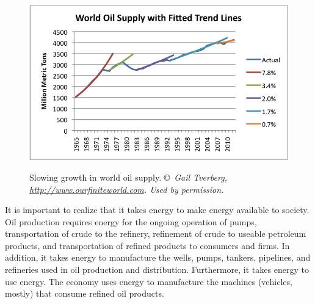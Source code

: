 \begin{figure}[!ht]
\centering\
\includegraphics[width=\linewidth]{Part_0/Chapter_Introduction/images/growth-in-world-oil-supply.png}
\caption[World Oil Supply]{Slowing growth in world oil supply.\cite[Figure~3]{Tverberg:2013aa}
\copyright~\emph{Gail Tverberg, {\scriptsize \emph{\url{http://www.ourfiniteworld.com}}}. Used by permission.}}
\label{fig:oil_production}
\end{figure}

It is important to realize that it takes energy to make energy available to society.
Oil production requires energy for the ongoing
operation of pumps, 
transportation of crude to the refinery,
refinement of crude to useable petroleum products, and 
transportation of refined products to consumers and firms.
In addition, it takes energy to manufacture the wells, pumps, 
tankers, pipelines, and
refineries used in oil production and distribution.
Furthermore, it takes energy to use energy. 
The economy uses energy to manufacture the machines (vehicles, mostly)
that consume refined oil products.

